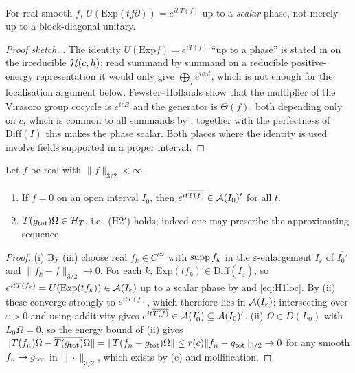 \begin{lemma}\label{lem:phase}
For real smooth $f$, $U(\mathrm{Exp}(tf\partial))=e^{it\,\overline{T(f)}}$ up to a \emph{scalar} phase, not
merely up to a block-diagonal unitary.
\end{lemma}

\begin{proof}[Proof sketch]
\cite[Lemma 4.2]{RigorC}.  The identity $U(\mathrm{Exp} f)=e^{iT(f)}$ ``up to a phase'' is stated in
\cite[\S2.1]{CDIT} on the irreducible $\mathcal H(c,h)$; read summand by summand on a reducible positive-energy
representation it would only give $\bigoplus_{j}e^{i\alpha_{j}t}$, which is not enough for the localisation
argument below.  Fewster--Hollands \cite[Prop.~5.1, eqs.~(5.7)--(5.8)]{FH05} show that the multiplier of
the Virasoro group cocycle is $e^{ic\widetilde B}$ and the generator is $\Theta(f)$, both depending only on
$c$, which is common to all summands by \cite[Prop.~3.14]{CDIT}; together with the perfectness of
$\mathrm{Diff}(I)$ this makes the phase scalar.  Both places where the identity is used involve fields
supported in a proper interval.
\end{proof}

\begin{lemma}\label{lem:loc}
Let $f$ be real with $\|f\|_{3/2}<\infty$.
\begin{enumerate}[label=\textup{(\roman*)},leftmargin=2.4em]
\item If $f=0$ on an open interval $I_{0}$, then $e^{it\overline{T(f)}}\in\mathcal A(I_{0})'$ for all $t$.
\item $T(g_{\rm tot})\Omega\in\mathcal H_T$, i.e.\ \textup{(H2$'$)} holds; indeed one may prescribe the
 approximating sequence.
\end{enumerate}
\end{lemma}

\begin{proof}
(i) By (iii) choose real $f_{k}\in C^{\infty}$ with $\operatorname{supp} f_{k}$ in the
$\varepsilon$-enlargement $I_{\varepsilon}$ of $\overline{I_{0}'}$ and $\|f_{k}-f\|_{3/2}\to0$.  For each
$k$, $\mathrm{Exp}(tf_{k})\in\mathrm{Diff}(\overline{I_{\varepsilon}})$, so
$e^{itT(f_{k})}=U(\mathrm{Exp}(tf_{k}))\in\mathcal A(I_{\varepsilon})$ up to a scalar phase by  and
\eqref{eq:H1loc}.  By (ii) these converge strongly to $e^{it\overline{T(f)}}$, which therefore
lies in $\mathcal A(I_{\varepsilon})$; intersecting over $\varepsilon>0$ and using additivity gives
$e^{it\overline{T(f)}}\in\mathcal A(I_{0}')\subseteq\mathcal A(I_{0})'$.
(ii) $\Omega\in D(L_{0})$ with $L_{0}\Omega=0$, so the energy bound of (ii) gives
$\|T(f_{n})\Omega-\overline{T(g_{\rm tot})}\Omega\|=\|T(f_{n}-g_{\rm tot})\Omega\|
\le r(c)\|f_{n}-g_{\rm tot}\|_{3/2}\to0$ for any smooth $f_{n}\to g_{\rm tot}$ in $\|\cdot\|_{3/2}$, which
exists by (c) and mollification.
\end{proof}

